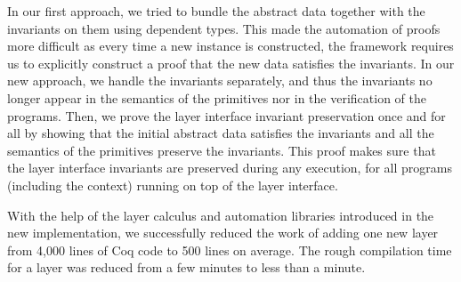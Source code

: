 In our first approach, we tried to bundle the abstract data together
with the invariants on them using dependent types. This made the
automation of proofs more difficult as every time a new instance is
constructed, the framework requires us to explicitly construct a proof
that the new data satisfies the invariants. In our new approach, we
handle the invariants separately, and thus the invariants no longer
appear in the semantics of the primitives nor in the verification of
the programs. Then, we prove the layer interface invariant
preservation once and for all by showing that the initial abstract
data satisfies the invariants and all the semantics of the primitives
preserve the invariants. This proof makes sure that the layer
interface invariants are preserved during any execution, for all
programs (including the context) running on top of the layer
interface.

With the help of the layer calculus and automation libraries
introduced in the new implementation, we successfully reduced the work
of adding one new layer from 4,000 lines of Coq code to 500 lines on
average.  The rough compilation time for a layer was reduced from a
few minutes to less than a minute.


